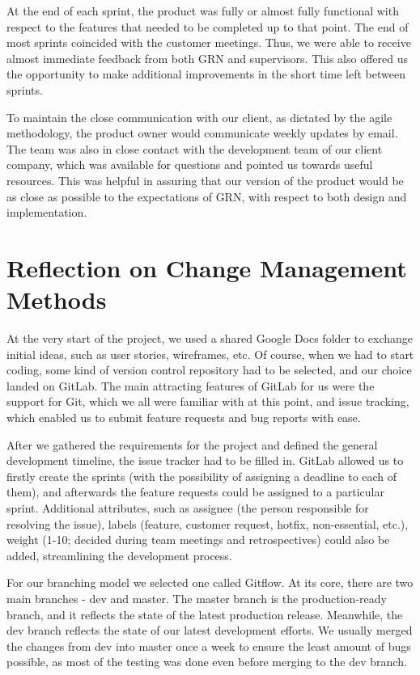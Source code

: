 \documentclass{l3proj}
\begin{document}
At the end of each sprint, the product was fully or almost fully
 functional with respect to the features that needed to be completed
 up to that point. The end of most sprints coincided with the customer
 meetings. Thus, we were able to receive almost immediate feedback
 from both GRN and supervisors. This also offered us the opportunity
 to make additional improvements in the short time left between sprints.

To maintain the close communication with our client, as dictated by
 the agile methodology, the product owner would communicate weekly
 updates by email. The team was also in close contact with the
 development team of our client company, which was available
 for questions and pointed us towards useful resources. This
 was helpful in assuring that our version of the product would
 be as close as possible to the expectations of GRN, with respect
 to both design and implementation.

\newpage
\section{Reflection on Change Management Methods}
\label{sec:changemgmt}

At the very start of the project, we used a shared Google Docs folder to exchange initial ideas, such as user stories, wireframes, etc. Of course, when we had to start coding, some kind of version control repository had to be selected, and our choice landed on GitLab. The main attracting features of GitLab for us were the support for Git, which we all were familiar with at this point, and issue tracking, which enabled us to submit feature requests and bug reports with ease.

After we gathered the requirements for the project and defined the general development timeline, the issue tracker had to be filled in. GitLab allowed us to firstly create the sprints (with the possibility of assigning a deadline to each of them), and afterwards the feature requests could be assigned to a particular sprint. Additional attributes, such as assignee (the person responsible for resolving the issue), labels (feature, customer request, hotfix, non-essential, etc.), weight (1-10; decided during team meetings and retrospectives) could also be added, streamlining the development process.

For our branching model we selected one called Gitflow. \cite{gitflow} At its core, there are two main branches - dev and master. The master branch is the production-ready branch, and it reflects the state of the latest production release. Meanwhile, the dev branch reflects the state of our latest development efforts. We usually merged the changes from dev into master once a week to ensure the least amount of bugs possible, as most of the testing was done even before merging to the dev branch.
\end{document}
